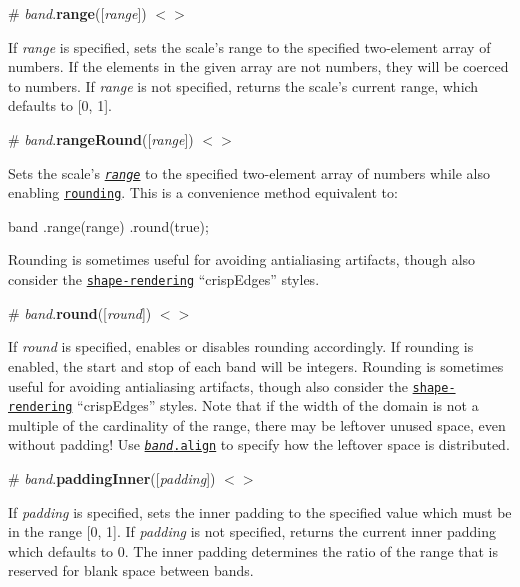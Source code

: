\label{_band_range}%
\# {\itshape band}.{\bfseries range}(\mbox{[}{\itshape range}\mbox{]}) \href{https://github.com/d3/d3-scale/blob/master/src/band.js#L36}{\tt $<$$>$}

If {\itshape range} is specified, sets the scale’s range to the specified two-\/element array of numbers. If the elements in the given array are not numbers, they will be coerced to numbers. If {\itshape range} is not specified, returns the scale’s current range, which defaults to \mbox{[}0, 1\mbox{]}.

\label{_band_rangeRound}%
\# {\itshape band}.{\bfseries range\+Round}(\mbox{[}{\itshape range}\mbox{]}) \href{https://github.com/d3/d3-scale/blob/master/src/band.js#L40}{\tt $<$$>$}

Sets the scale’s \href{#band_range}{\tt {\itshape range}} to the specified two-\/element array of numbers while also enabling \href{#band_round}{\tt rounding}. This is a convenience method equivalent to\+:


\begin{DoxyCode}
band
    .range(range)
    .round(true);
\end{DoxyCode}


Rounding is sometimes useful for avoiding antialiasing artifacts, though also consider the \href{https://developer.mozilla.org/en-US/docs/Web/SVG/Attribute/shape-rendering}{\tt shape-\/rendering} “crisp\+Edges” styles.

\label{_band_round}%
\# {\itshape band}.{\bfseries round}(\mbox{[}{\itshape round}\mbox{]}) \href{https://github.com/d3/d3-scale/blob/master/src/band.js#L52}{\tt $<$$>$}

If {\itshape round} is specified, enables or disables rounding accordingly. If rounding is enabled, the start and stop of each band will be integers. Rounding is sometimes useful for avoiding antialiasing artifacts, though also consider the \href{https://developer.mozilla.org/en-US/docs/Web/SVG/Attribute/shape-rendering}{\tt shape-\/rendering} “crisp\+Edges” styles. Note that if the width of the domain is not a multiple of the cardinality of the range, there may be leftover unused space, even without padding! Use \href{#band_align}{\tt {\itshape band}.align} to specify how the leftover space is distributed.

\label{_band_paddingInner}%
\# {\itshape band}.{\bfseries padding\+Inner}(\mbox{[}{\itshape padding}\mbox{]}) \href{https://github.com/d3/d3-scale/blob/master/src/band.js#L60}{\tt $<$$>$}

If {\itshape padding} is specified, sets the inner padding to the specified value which must be in the range \mbox{[}0, 1\mbox{]}. If {\itshape padding} is not specified, returns the current inner padding which defaults to 0. The inner padding determines the ratio of the range that is reserved for blank space between bands.


